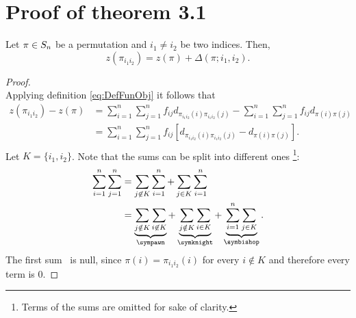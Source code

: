 \chapter{Proof of theorem 3.1}
\label{AppendiceA}

\begin{teo*}

	Let $\pi \in S_n$ be a permutation and $i_1 \neq i_2$ be  two indices. Then, 
	\begin{equation}
	z(\pi_{i_1 i_2}) = z(\pi) + \Delta(\pi; i_1,i_2).
	\end{equation} 
\end{teo*}
\begin{proof}\mbox{}\\
	\noindent Applying definition \eqref{eq:DefFunObj} it follows that
	\begin{equation}
	\begin{split}
	z(\pi_{i_1 i_2})-z(\pi)
	&=\sum_{i=1}^n\sum_{j=1}^n 
	f_{ij}d_{\pi_{i_1i_2}(i)\pi_{i_1i_2}(j)}
	-
	\sum_{i=1}^n\sum_{j=1}^n
	f_{ij}d_{\pi(i)\pi(j)} \\
	&=\sum_{i=1}^n\sum_{j=1}^n f_{ij}\left[d_{\pi_{i_1i_2}(i)\pi_{i_1i_2}(j)}-d_{\pi(i)\pi(j)}\right].\\
	\end{split}
	\end{equation}
	Let $K=\{i_1,i_2\}$. Note that the sums can be split into different ones \footnote{Terms of the sums are omitted for sake of clarity.}:
	\[
	\begin{split}
	\sum_{i=1}^n\sum_{j=1}^n &= \sum_{j \not \in K }\sum_{i=1}^n+\sum_{j \in K} \sum_{i=1}^n\\
	&= \underbrace{\sum_{j\notin K}  \sum_{i \not \in K }}_{\sympawn} +\underbrace{\sum_{j\notin K}  \sum_{i  \in K }}_{\symknight} + \underbrace{\sum_{i=1}^n \sum_{j \in K}}_{\symbishop}.
	\end{split} 
	\]
	The first sum \sympawn \ is null, since $\pi(i)=\pi_{i_1 i_2}(i)$ for every $i \notin K$ and therefore every term is $0$.
	

\end{proof}
